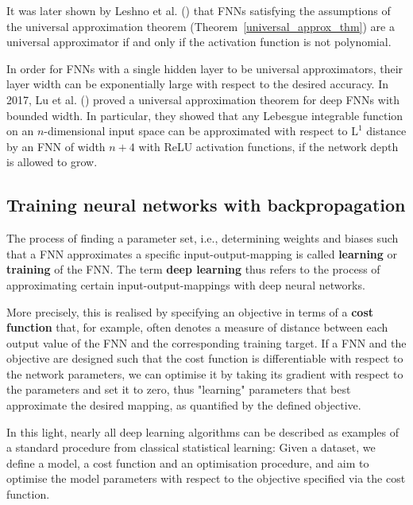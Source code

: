 It was later shown by Leshno et al. (\cite{Leshno1993}) that FNNs satisfying the assumptions of the universal approximation theorem (Theorem~\ref{universal_approx_thm}) are a universal approximator if and only if the activation function is not polynomial.

In order for FNNs with a single hidden layer to be universal approximators, their layer width can be exponentially large with respect to the desired accuracy. In 2017, Lu et al. (\cite{Lu2017}) proved a universal approximation theorem for deep FNNs with bounded width. In particular, they showed that any Lebesgue integrable function on an $n$-dimensional input space can be approximated with respect to $\mathrm{L}^1$ distance by an FNN of width $n+4$ with ReLU activation functions, if the network depth is allowed to grow.

\subsection{Training neural networks with backpropagation}\label{sec:backprop}
The process of finding a parameter set, i.e., determining weights and biases such that a FNN approximates a specific input-output-mapping is called \textbf{learning} or \textbf{training} of the FNN. The term \textbf{deep learning} thus refers to the process of approximating certain input-output-mappings with deep neural networks. 

More precisely, this is realised by specifying an objective in terms of a \textbf{cost function} that, for example, often denotes a measure of distance between each output value of the FNN and the corresponding training target. If a FNN and the objective are designed such that the cost function is differentiable with respect to the network parameters, we can optimise it by taking its gradient with respect to the parameters and set it to zero, thus "learning" parameters that best approximate the desired mapping, as quantified by the defined objective. 

In this light, nearly all deep learning algorithms can be described as examples of a standard procedure from classical statistical learning: 
Given a dataset, we define a model, a cost function and an optimisation procedure, and aim to optimise the model parameters with respect to the objective specified via the cost function.

